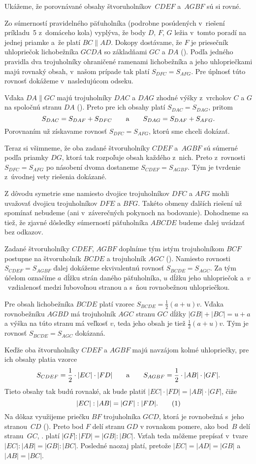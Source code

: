 {%
Ukážeme, že porovnávané obsahy štvoruholníkov~$CDEF$ a~$AGBF$ sú
si rovné.
%

Zo súmerností pravidelného päťuholníka (podrobne posúdených
v~riešení príkladu~5 z~domáceho kola) vyplýva, že
body $D$, $F$, $G$ ležia v~tomto poradí na jednej priamke a~že platí
$BC\parallel AD$. Dokopy dostávame, že $F$ je priesečník
uhlopriečok lichobežníka $GCDA$ so základňami $GC$ a $DA$ (\obr).
Podľa jedného pravidla dva trojuholníky
ohraničené ramenami lichobežníka a jeho uhlopriečkami majú rovnaký
obsah, v~našom prípade tak platí $S_{DFC}=S_{AFG}$.
Pre úplnosť túto rovnosť dokážeme v~nasledujúcom odseku.

Vďaka $DA\parallel GC$ majú trojuholníky $DAC$ a $DAG$ zhodné
výšky z~vrcholov $C$ a $G$ na spoločnú stranu $DA$ (\obr).
Preto pre ich obsahy platí $S_{DAC}=S_{DAG}$, pritom
$$
S_{DAC}=S_{DAF}+S_{DFC}\qquad\hbox{a}\qquad
S_{DAG}=S_{DAF}+S_{AFG}.
$$
Porovnaním už získavame rovnosť $S_{DFC}=S_{AFG}$, ktorú sme
chceli dokázať.

Teraz si všimneme, že oba zadané štvoruholníky $CDEF$ a~$AGBF$
sú súmerné podľa priamky $DG$, ktorá tak rozpoľuje obsah každého
z~nich. Preto z~rovnosti $S_{DFC}=S_{AFG}$ po násobení
dvoma dostaneme $S_{CDEF}=S_{AGBF}$.
Tým je tvrdenie z~úvodnej vety riešenia dokázané.

\poznamka
Z dôvodu symetrie sme namiesto dvojice
trojuholníkov $DFC$ a $AFG$ mohli uvažovať dvojicu trojuholníkov $DFE$ a $BFG$.
Takéto obmeny ďalších riešení už spomínať nebudeme
(ani v~záverečných pokynoch na bodovanie).
Dohodneme sa tiež, že
zjavné dôsledky súmerností päťuholníka $ABCDE$
budeme ďalej uvádzať bez odkazov.

\ineriesenie
Zadané štvoruholníky $CDEF$, $AGBF$ doplníme tým istým trojuholníkom $BCF$
postupne na štvoruholník $BCDE$ a trojuholník $AGC$ (\obr).
Namiesto rovnosti $S_{CDEF}=S_{AGBF}$ ďalej dokážeme
ekvivalentnú rovnosť $S_{BCDE}=S_{AGC}$. Za tým účelom označíme
$a$ dĺžku strán daného päťuholníka, $u$ dĺžku jeho
uhlopriečok a~$v$~vzdialenosť medzi ľubovoľnou stranou
a s~ňou rovnobežnou uhlopriečkou.
%

Pre obsah lichobežníka $BCDE$ platí vzorec
$S_{BCDE}=\frac12(a+u)v$. Vďaka rovnobežníku $AGBD$ má trojuholník $AGC$
stranu $GC$ dĺžky $|GB|+|BC|=u+a$ a výška na túto stranu má veľkosť
$v$, teda jeho obsah je tiež $\frac12(a+u)v$.
Tým je rovnosť $S_{BCDE}=S_{AGC}$ dokázaná.

\ineriesenie
Keďže oba štvoruholníky $CDEF$ a $AGBF$ majú navzájom
kolmé uhlopriečky, pre ich obsahy platia vzorce
$$
S_{CDEF}=\frac12\cdot|EC|\cdot |FD|\qquad\hbox{a}\qquad
S_{AGBF}=\frac12\cdot|AB|\cdot |GF|.
$$
Tieto obsahy tak budú rovnaké, ak bude platiť
$|EC|\cdot |FD|=|AB|\cdot |GF|$, čiže
$$
|EC|:|AB|=|GF|:|FD|.
\tag1
$$
Na dôkaz  využijeme priečku $BF$ trojuholníka $GCD$, ktorá je rovnobežná
s~jeho stranou~$CD$ (\obr). Preto bod $F$ delí stranu $GD$ v rovnakom
pomere, ako bod~$B$ delí stranu~$GC$, \tj. platí
$|GF|:|FD|=|GB|:|BC|$. Vzťah  teda môžeme prepísať
v~tvare $|EC|:|AB|=|GB|:|BC|$. Posledné naozaj platí, pretože
$|EC|=|AD|=|GB|$ a~$|AB|=|BC|$.
%


}
